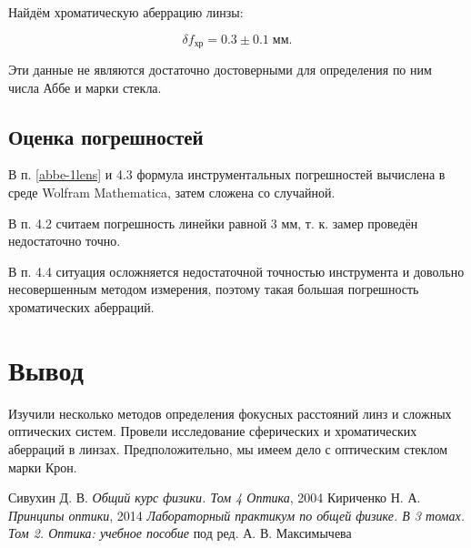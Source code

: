 \documentclass[a4paper]{article}
\begin{document}
Найдём хроматическую аберрацию линзы:

\begin{equation*}\label{key}
	\delta f_{хр} = 0.3 \pm 0.1 \; мм.
\end{equation*}

Эти данные не являются достаточно достоверными для определения по ним числа Аббе и марки стекла.

\subsection{Оценка погрешностей}

В п. \ref{abbe-1lens} и 4.3 формула инструментальных погрешностей вычислена в среде Wolfram Mathematica, затем сложена со случайной.

В п. 4.2 считаем погрешность линейки равной $ 3  $ мм, т. к. замер проведён недостаточно точно. 

В п. 4.4 ситуация осложняется недостаточной точностью инструмента и довольно несовершенным методом измерения, поэтому такая большая погрешность хроматических аберраций.

\section{Вывод}
Изучили несколько методов определения фокусных расстояний линз и сложных оптических систем. Провели исследование сферических и хроматических аберраций в линзах. Предположительно, мы имеем дело с оптическим стеклом марки Крон. 

\begin{thebibliography}{9}
	 Сивухин Д. В. \emph{Общий курс физики. Том 4 Оптика}, 2004
	 Кириченко Н. А. \emph{Принципы оптики}, 2014
	 \emph{Лабораторный практикум по общей физике. В 3 томах. Том 2. Оптика: учебное пособие} под ред. А. В. Максимычева
\end{thebibliography}
\end{document}
